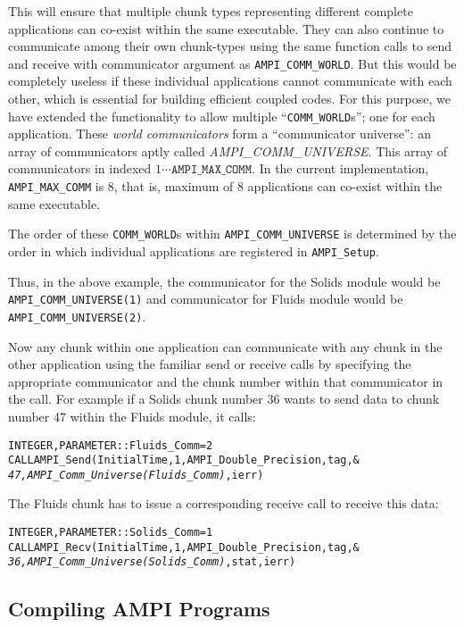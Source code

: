 \documentclass[10pt]{article}
\begin{document}
This will ensure that multiple chunk types representing different complete
applications can co-exist within the same executable. They can also continue to
communicate among their own chunk-types using the same \ampi{} function calls
to send and receive with communicator argument as \texttt{AMPI\_COMM\_WORLD}.
But this would be completely useless if these individual applications cannot
communicate with each other, which is essential for building efficient coupled
codes.  For this purpose, we have extended the \ampi{} functionality to allow
multiple ``\texttt{COMM\_WORLD}s''; one for each application. These \emph{world
communicators} form a ``communicator universe'': an array of communicators
aptly called \emph{AMPI\_COMM\_UNIVERSE}. This array of communicators in
indexed $1\cdots\texttt{AMPI\_MAX\_COMM}$. In the current implementation,
\texttt{AMPI\_MAX\_COMM} is 8, that is, maximum of 8 applications can co-exist
within the same executable.

The order of these \texttt{COMM\_WORLD}s within \texttt{AMPI\_COMM\_UNIVERSE}
is determined by the order in which individual applications are registered in
\texttt{AMPI\_Setup}.

Thus, in the above example, the communicator for the Solids module would be
\texttt{AMPI\_COMM\_UNIVERSE(1)} and communicator for Fluids module would be
\texttt{AMPI\_COMM\_UNIVERSE(2)}.

Now any chunk within one application can communicate with any chunk in the
other application using the familiar send or receive \ampi{} calls by
specifying the appropriate communicator and the chunk number within that
communicator in the call. For example if a Solids chunk number 36 wants to send
data to chunk number 47 within the Fluids module, it calls:

\begin{alltt}
INTEGER , PARAMETER :: Fluids_Comm = 2
CALL AMPI_Send(InitialTime, 1, AMPI_Double_Precision, tag, &
        \emph{47, AMPI_Comm_Universe(Fluids_Comm)}, ierr)
\end{alltt}

The Fluids chunk has to issue a corresponding receive call to receive this
data:

\begin{alltt}
INTEGER , PARAMETER :: Solids_Comm = 1
CALL AMPI_Recv(InitialTime, 1, AMPI_Double_Precision, tag, &
        \emph{36, AMPI_Comm_Universe(Solids_Comm)}, stat, ierr)
\end{alltt}

\subsection{Compiling AMPI Programs}
\end{document}
